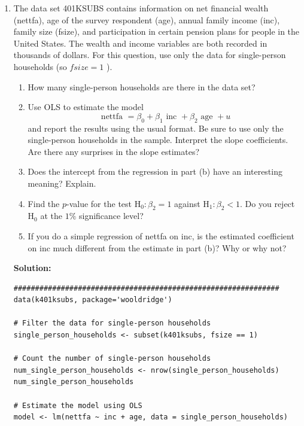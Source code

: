 \documentclass[12pt]{article}
\begin{document}
\begin{enumerate}
{\begin{enumerate}
\begin{verbatim}
# Summary of the model
summary(model_b)
\end{verbatim}
\end{enumerate}

}

    \item The data set 401KSUBS contains information on net financial wealth (nettfa), age of the survey respondent (age), annual family income (inc), family size (fsize), and participation in certain pension plans for people in the United States. The wealth and income variables are both recorded in thousands of dollars. For this question, use only the data for single-person households (so $fsize=1$ ).
\begin{enumerate}
\item How many single-person households are there in the data set?
\item Use OLS to estimate the model
$$
\text { nettfa }=\beta_0+\beta_1 \text { inc }+\beta_2 \text { age }+u
$$
and report the results using the usual format. Be sure to use only the single-person households in the sample. Interpret the slope coefficients. Are there any surprises in the slope estimates?
\item Does the intercept from the regression in part (b) have an interesting meaning? Explain.
\item Find the $p$-value for the test $\mathrm{H}_0: \beta_2=1$ against $\mathrm{H}_1: \beta_2<1$. Do you reject $\mathrm{H}_0$ at the $1 \%$ significance level?
\item If you do a simple regression of nettfa on inc, is the estimated coefficient on inc much different from the estimate in part (b)? Why or why not?

\end{enumerate}


{\color{blue}
\noindent \textbf{Solution:}

\begin{verbatim}
##############################################################
data(k401ksubs, package='wooldridge')

# Filter the data for single-person households
single_person_households <- subset(k401ksubs, fsize == 1)

# Count the number of single-person households
num_single_person_households <- nrow(single_person_households)
num_single_person_households

# Estimate the model using OLS
model <- lm(nettfa ~ inc + age, data = single_person_households)


\end{verbatim}}
\end{enumerate}
\end{document}
